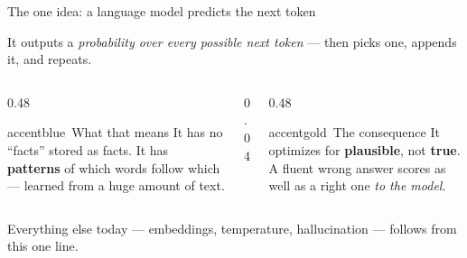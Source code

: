 \begin{frame}{The one idea: a language model predicts the next token}
  \begin{center}
  \end{center}
  \vspace{2pt}
  \begin{center}\footnotesize\color{midgray}%
    It outputs a \emph{probability over every possible next token} --- then picks one, appends it, and repeats.\end{center}
  \vspace{6pt}
  \begin{columns}[t,totalwidth=\textwidth]
    \begin{column}{0.48\textwidth}
      \begin{featbox}{accentblue}{\faCogs\ What that means}
        \scriptsize It has no ``facts'' stored as facts. It has \textbf{patterns} of
        which words follow which --- learned from a huge amount of text.
      \end{featbox}
    \end{column}
    \begin{column}{0.04\textwidth}\end{column}
    \begin{column}{0.48\textwidth}
      \begin{featbox}{accentgold}{\faExclamationTriangle\ The consequence}
        \scriptsize It optimizes for \textbf{plausible}, not \textbf{true}. A fluent
        wrong answer scores as well as a right one \emph{to the model}.
      \end{featbox}
    \end{column}
  \end{columns}
  \vspace{6pt}
  \begin{center}\small\color{labnavy}Everything else today --- embeddings, temperature, hallucination --- follows from this one line.\end{center}
\end{frame}

